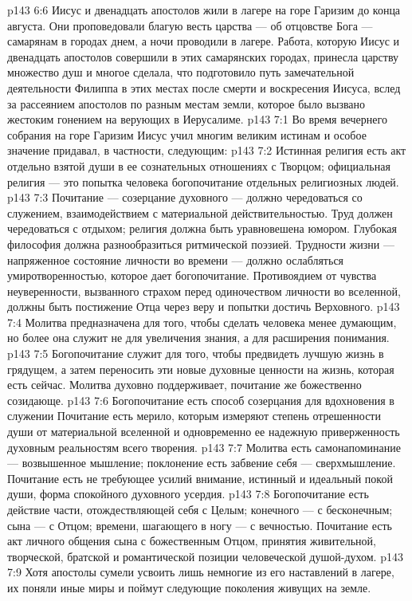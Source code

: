 \vs p143 6:6 Иисус и двенадцать апостолов жили в лагере на горе Гаризим до конца августа. Они проповедовали благую весть царства --- об отцовстве Бога --- самарянам в городах днем, а ночи проводили в лагере. Работа, которую Иисус и двенадцать апостолов совершили в этих самарянских городах, принесла царству множество душ и многое сделала, что подготовило путь замечательной деятельности Филиппа в этих местах после смерти и воскресения Иисуса, вслед за рассеянием апостолов по разным местам земли, которое было вызвано жестоким гонением на верующих в Иерусалиме.
\vs p143 7:1 Во время вечернего собрания на горе Гаризим Иисус учил многим великим истинам и особое значение придавал, в частности, следующим:
\vs p143 7:2 \pc Истинная религия есть акт отдельно взятой души в ее сознательных отношениях с Творцом; официальная религия --- это попытка человека  богопочитание отдельных религиозных людей.
\vs p143 7:3 \pc Почитание --- созерцание духовного --- должно чередоваться со служением, взаимодействием с материальной действительностью. Труд должен чередоваться с отдыхом; религия должна быть уравновешена юмором. Глубокая философия должна разнообразиться ритмической поэзией. Трудности жизни --- напряженное состояние личности во времени --- должно ослабляться умиротворенностью, которое дает богопочитание. Противоядием от чувства неуверенности, вызванного страхом перед одиночеством личности во вселенной, должны быть постижение Отца через веру и попытки достичь Верховного.
\vs p143 7:4 \pc Молитва предназначена для того, чтобы сделать человека менее думающим, но более  она служит не для увеличения знания, а для расширения понимания.
\vs p143 7:5 \pc Богопочитание служит для того, чтобы предвидеть лучшую жизнь в грядущем, а затем переносить эти новые духовные ценности на жизнь, которая есть сейчас. Молитва духовно поддерживает, почитание же божественно созидающе.
\vs p143 7:6 \pc Богопочитание есть способ созерцания  для вдохновения в служении  Почитание есть мерило, которым измеряют степень отрешенности души от материальной вселенной и одновременно ее надежную приверженность духовным реальностям всего творения.
\vs p143 7:7 \pc Молитва есть самонапоминание --- возвышенное мышление; поклонение есть забвение себя --- сверхмышление. Почитание есть не требующее усилий внимание, истинный и идеальный покой души, форма спокойного духовного усердия.
\vs p143 7:8 \pc Богопочитание есть действие части, отождествляющей себя с Целым; конечного --- с бесконечным; сына --- с Отцом; времени, шагающего в ногу --- с вечностью. Почитание есть акт личного общения сына с божественным Отцом, принятия живительной, творческой, братской и романтической позиции человеческой душой\hyp{}духом.
\vs p143 7:9 \pc Хотя апостолы сумели усвоить лишь немногие из его наставлений в лагере, их поняли иные миры и поймут следующие поколения живущих на земле.
